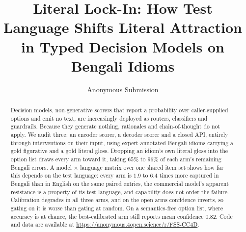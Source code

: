 \documentclass[11pt]{article}
\title{
    Literal Lock-In: How Test Language Shifts Literal Attraction\\
    in Typed Decision Models on Bengali Idioms
}
\author{Anonymous Submission}
\begin{document}
\maketitle

\begin{abstract}
Decision models, non-generative scorers that report a probability over
caller-supplied options and emit no text, are increasingly deployed as routers,
classifiers and guardrails. Because they generate nothing, rationales and
chain-of-thought do not apply. We audit three: an encoder scorer, a decoder
scorer and a closed API, entirely through interventions on their input, using
expert-annotated Bengali idioms carrying a gold figurative and a gold literal
gloss. Dropping an idiom's own literal gloss into the option list draws every arm
toward it, taking $65\%$ to $96\%$ of each arm's remaining Bengali errors. A model
$\times$ language matrix over one shared item set shows how far this depends on
the test language: every arm is $1.9$ to $6.4$ times more captured in Bengali than
in English on the same paired entries, the commercial model's apparent resistance
is a property of its test language, and capability does not order the failure.
Calibration degrades in all three arms, and on the open arms
confidence inverts, so gating on it is worse than gating at random. On a
semantics-free option list, where accuracy is at chance, the best-calibrated arm
still reports mean confidence $0.82$. Code and data are available at
\url{https://anonymous.4open.science/r/FSS-CC4D}.
\end{abstract}


\end{document}
